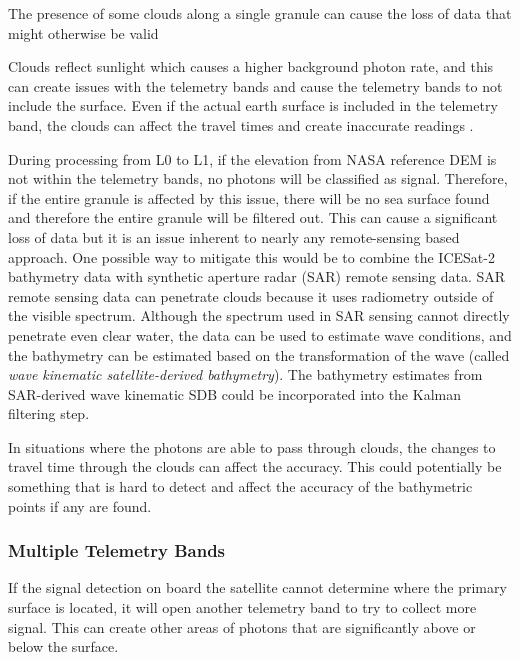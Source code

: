 The presence of some clouds along a single granule can cause the loss of data that might otherwise be valid

Clouds reflect sunlight which causes a higher background photon rate, and this can create issues with the telemetry bands and cause the telemetry bands to not include the surface. Even if the actual earth surface is included in the telemetry band, the clouds can affect the travel times and create inaccurate readings \parencite{atl03knownissues}.

During processing from L0 to L1, if the elevation from NASA reference DEM is not within the telemetry bands, no photons will be classified as signal. Therefore, if the entire granule is affected by this issue, there will be no sea surface found and therefore the entire granule will be filtered out. This can cause a significant loss of data but it is an issue inherent to nearly any remote-sensing based approach. One possible way to mitigate this would be to combine the ICESat-2 bathymetry data with synthetic aperture radar (SAR) remote sensing data. SAR remote sensing data can penetrate clouds because it uses radiometry outside of the visible spectrum. Although the spectrum used in SAR sensing cannot directly penetrate even clear water, the data can be used to estimate wave conditions, and the bathymetry can be estimated based on the transformation of the wave (called \emph{wave kinematic satellite-derived bathymetry}). The bathymetry estimates from SAR-derived wave kinematic SDB could be incorporated into the Kalman filtering step. 

In situations where the photons are able to pass through clouds, the changes to travel time through the clouds can affect the accuracy. This could potentially be something that is hard to detect and affect the accuracy of the bathymetric points if any are found.
 

\subsubsection{Multiple Telemetry Bands}

If the signal detection on board the satellite cannot determine where the primary surface is located, it will open another telemetry band to try to collect more signal. This can create other areas of photons that are significantly above or below the surface.

